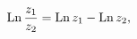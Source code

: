 \[\mathop{\mathrm{Ln}\/}\nolimits\frac{z_{1}}{z_{2}}=\mathop{\mathrm{Ln}\/}%
\nolimits z_{1}-\mathop{\mathrm{Ln}\/}\nolimits z_{2},\]